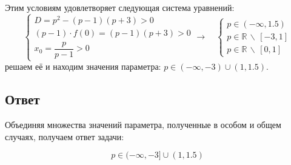 Этим условиям удовлетворяет следующая система уравнений:
\begin {equation*}
    \begin {cases}
        D = p^2 - (p-1)(p+3)  > 0
        \\
        (p - 1) \cdot f(0) = (p-1)(p+3) > 0
        \\
        x_0 = \dfrac{p}{p-1} > 0
    \end {cases}
    \longrightarrow\quad
    \begin {cases}
        p \in (-\infty, 1.5)
        \\
        p \in \mathbb{R} \, \backslash \, [-3, 1]
        \\
        p \in \mathbb{R} \, \backslash \, [0, 1]
    \end {cases}
\end {equation*}
решаем её и находим значения параметра: $p \in (-\infty, -3) \cup (1, 1.5)$.

\subsection * {Ответ}
Объединяя множества значений параметра, полученные в особом и общем случаях, получаем ответ задачи:

\begin {equation*}
    \boxed{p \in (-\infty, -3] \cup (1, 1.5)}
\end {equation*}
